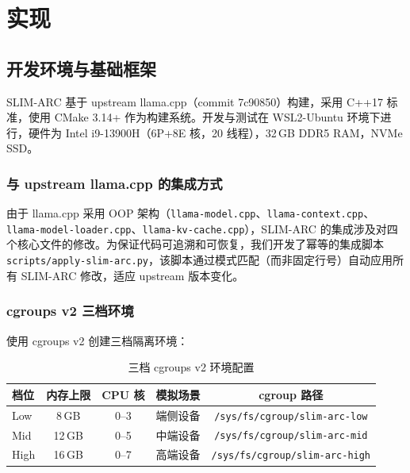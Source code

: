 \newpage
\section{实现}

\subsection{开发环境与基础框架}

SLIM-ARC 基于 upstream llama.cpp（commit 7c90850）构建，采用 C++17 标准，使用 CMake 3.14+ 作为构建系统。开发与测试在 WSL2-Ubuntu 环境下进行，硬件为 Intel i9-13900H（6P+8E 核，20 线程），32\,GB DDR5 RAM，NVMe SSD。

\subsubsection{与 upstream llama.cpp 的集成方式}

由于 llama.cpp 采用 OOP 架构（\texttt{llama-model.cpp}、\texttt{llama-context.cpp}、\texttt{llama-model-loader.cpp}、\texttt{llama-kv-cache.cpp}），SLIM-ARC 的集成涉及对四个核心文件的修改。为保证代码可追溯和可恢复，我们开发了幂等的集成脚本 \texttt{scripts/apply-slim-arc.py}，该脚本通过模式匹配（而非固定行号）自动应用所有 SLIM-ARC 修改，适应 upstream 版本变化。

\subsubsection{cgroups v2 三档环境}

使用 cgroups v2 创建三档隔离环境：

\begin{table}[H]
    \centering
    \caption{三档 cgroups v2 环境配置}
    \label{tab:cgroups_config}
    \begin{tabular}{lcccc}
        \toprule
        \textbf{档位} & \textbf{内存上限} & \textbf{CPU 核} & \textbf{模拟场景} & \textbf{cgroup 路径} \\
        \midrule
        Low  & 8\,GB  & 0--3  & 端侧设备 & \texttt{/sys/fs/cgroup/slim-arc-low} \\
        Mid  & 12\,GB & 0--5  & 中端设备 & \texttt{/sys/fs/cgroup/slim-arc-mid} \\
        High & 16\,GB & 0--7  & 高端设备 & \texttt{/sys/fs/cgroup/slim-arc-high} \\
        \bottomrule
    \end{tabular}
\end{table}

